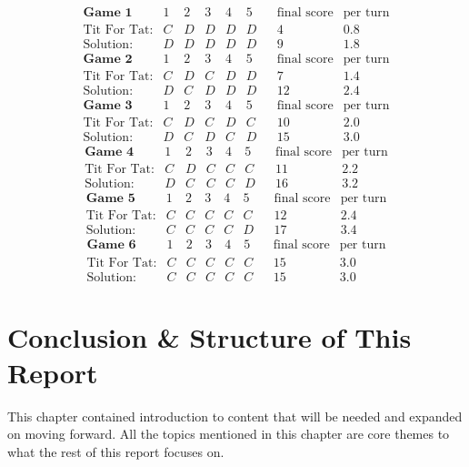 $$
\begin{matrix}
     \textbf{Game 1}& 1 & 2 & 3 & 4 & 5 & &\text{final score} & \text{per turn}\\
    \text{Tit For Tat:} & C & D & D & D & D && 4 & 0.8\\
    \text{Solution:} & D & D & D & D & D && 9 & 1.8
\end{matrix}
$$
$$
\begin{matrix}
     \textbf{Game 2}& 1 & 2 & 3 & 4 & 5 & &\text{final score} & \text{per turn}\\
    \text{Tit For Tat:} & C & D & C & D & D && 7 & 1.4\\
    \text{Solution:} & D & C & D & D & D && 12 & 2.4
\end{matrix}
$$
$$
\begin{matrix}
     \textbf{Game 3}& 1 & 2 & 3 & 4 & 5 & &\text{final score} & \text{per turn}\\
    \text{Tit For Tat:} & C & D & C & D & C && 10 & 2.0\\
    \text{Solution:} & D & C & D & C & D && 15 & 3.0
\end{matrix}
$$
$$
\begin{matrix}
     \textbf{Game 4}& 1 & 2 & 3 & 4 & 5 & &\text{final score} & \text{per turn}\\
    \text{Tit For Tat:} & C & D & C & C & C && 11 & 2.2\\
    \text{Solution:} & D & C & C & C & D && 16 & 3.2 
\end{matrix}
$$
$$
\begin{matrix}
     \textbf{Game 5}& 1 & 2 & 3 & 4 & 5 & &\text{final score} & \text{per turn}\\
    \text{Tit For Tat:} & C & C & C & C & C && 12 & 2.4\\
    \text{Solution:} & C & C & C & C & D && 17 & 3.4 
\end{matrix}
$$
$$
\begin{matrix}
     \textbf{Game 6}& 1 & 2 & 3 & 4 & 5 & &\text{final score} & \text{per turn}\\
    \text{Tit For Tat:} & C & C & C & C & C && 15 & 3.0\\
    \text{Solution:} & C & C & C & C & C && 15 & 3.0 
\end{matrix}
$$

\section{Conclusion \& Structure of This Report}
This chapter contained introduction to content that will be needed and expanded on moving forward. 
All the topics mentioned in this chapter are core themes to what the rest of this report focuses on.

